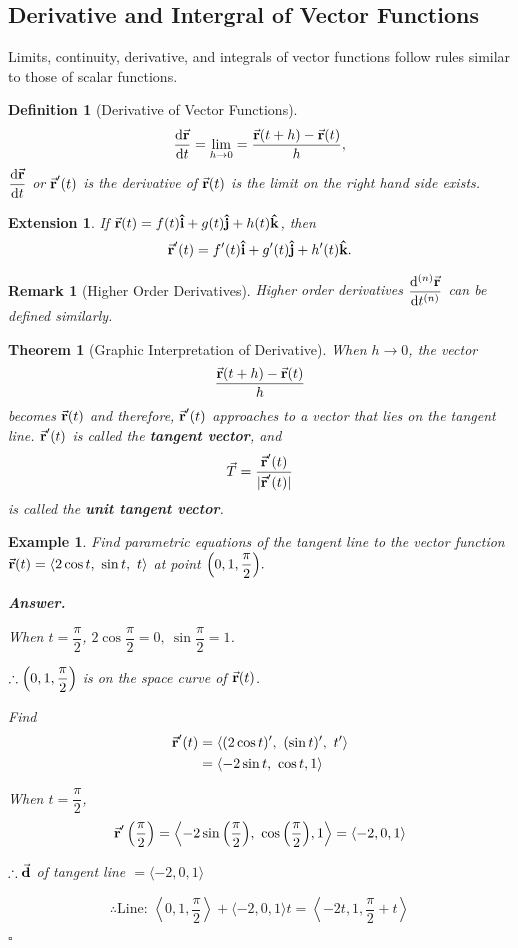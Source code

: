 \documentclass[12pt,a4paper]{article}
\newtheorem{thm}{Theorem}[subsection]
\newtheorem{df}{Definition}[subsection]
\newtheorem{eg}{Example}[subsection]
\newenvironment*{ans}{\par\indent\textbf{\textit{Answer. }}\par}{\par\hfill{$\square$}\par}
\newtheorem*{rmk}{\indent Remark}
\newtheorem*{ext}{\indent Extension}
\def\d{{\mathrm{d}}}
\def\vecd{\va{d}}
\def\vecr{\va{{\textbf{r}}}}
\def\veci{\vu{\boldsymbol{\textbf{i}}}}
\def\vecj{\vu{\boldsymbol{\textbf{j}}}}
\def\veck{\vu{\boldsymbol{\textbf{k}}}}
\begin{document}
\subsection{Derivative and Intergral of Vector Functions}
Limits, continuity, derivative, and integrals of vector functions follow rules similar to those of scalar functions.
\begin{df}[Derivative of Vector Functions]
	\[\frac{\d\vecr}{\d t}=\lim_{h\to0}=\frac{\vecr(t+h)-\vecr(t)}{h},\] $\dfrac{\d\vecr}{\d t}$ or $\vecr'(t)$ is the derivative of $\vecr(t)$ is the limit on the right hand side exists. 
\end{df}
\begin{ext}
	If $\vecr(t)=f(t)\veci+g(t)\vecj+h(t)\veck$, then\[\vecr'(t)=f'(t)\veci+g'(t)\vecj+h'(t)\veck.\]	
\end{ext}
\begin{rmk}[Higher Order Derivatives]
	Higher order derivatives $\dfrac{\d^{(n)}\vecr}{\d t^{(n)}}$ can be defined similarly. 	
\end{rmk}
\begin{thm}[Graphic Interpretation of Derivative]
	When $h\to0$, the vector \[\dfrac{\vecr(t+h)-\vecr(t)}{h}\] becomes $\vecr(t)$ and therefore, $\vecr'(t)$ approaches to a vector that lies on the tangent line. $\vecr'(t)$ is called the \textbf{tangent vector}, and \[\vec{T}=\dfrac{\vecr'(t)}{|\vecr'(t)|}\] is called the \textbf{unit tangent vector}.
\end{thm}
\begin{eg}
	Find parametric equations of the tangent line to the vector function $\vecr(t)=\langle2\cos{t},\ \sin{t},\ t\rangle$ at point $\qty(0,1,\dfrac{\pi}{2}).$
	\begin{ans}
		When $t=\dfrac{\pi}{2}$, $2\cos{\dfrac{\pi}{2}}=0,\ \sin{\dfrac{\pi}{2}}=1$.\par $\therefore\qty(0,1,\dfrac{\pi}{2})$ is on the space curve of $\vecr(t)$.\par Find \[\begin{aligned}\vecr'(t)&=\langle(2\cos{t})',\ (\sin{t})',\ t'\rangle\\&=\langle-2\sin{t},\ \cos{t}, 1\rangle\end{aligned}\]	\par When $t=\dfrac{\pi}{2}$, \[\vecr'\left(\frac{\pi}{2}\right)=\left\langle-2\sin{\left(\frac{\pi}{2}\right)},\ \cos{\left(\frac{\pi}{2}\right)}, 1\right\rangle=\langle-2,0,1\rangle\]\par $\therefore \vecd$ of tangent line $=\langle-2,0,1\rangle$\par \[\therefore\text{Line: }\left\langle0,1,\frac{\pi}{2}\right\rangle+\langle-2,0,1\rangle t=\left\langle-2t,1,\frac{\pi}{2}+t\right\rangle\]
	\end{ans}	
\end{eg}
\end{document}
